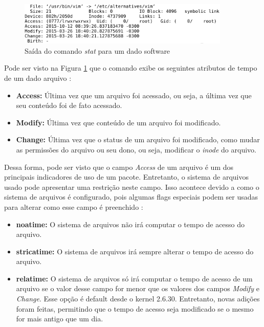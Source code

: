 \begin{figure}[h]
  \centering
  \includegraphics[width=0.9\textwidth]{figuras/comando_stat.eps}
  \caption{Saída do comando \textit{stat} para um dado software}
  \label{fig:comando_stat}
\end{figure}

Pode ser visto na Figura \ref{fig:comando_stat} que o comando exibe os seguintes
atributos de tempo de um dado arquivo \cite{1_haas}:

\begin{itemize}
    \item \textbf{Access:} Última vez que um arquivo foi acessado, ou seja, a
        última vez que seu conteúdo foi de fato acessado.
    \item \textbf{Modify:} Última vez que conteúdo de um arquivo foi modificado.
    \item \textbf{Change:} Última vez que o status de um arquivo foi modificado,
        como mudar as permissões do arquivo ou seu dono, ou seja, modificar o
        \textit{inode} do arquivo.
\end{itemize}

Dessa forma, pode ser visto que o campo \textit{Access} de um arquivo é um dos
principais indicadores de uso de um pacote. Entretanto, o sistema de arquivos
usado pode apresentar uma
restrição neste campo. Isso acontece devido a como o sistema de arquivos é
configurado, pois algumas flags especiais podem ser usadas para alterar como
esse campo é preenchido \cite{2_wiki.debian.org}:

\begin{itemize}
    \item \textbf{noatime:} O sistema de arquivos não irá computar o tempo de
        acesso do arquivo.
    \item \textbf{stricatime:} O sistema de arquivos irá sempre alterar o tempo
        de acesso do arquivo.
    \item \textbf{relatime:} O sistema de arquivos só irá computar o tempo de
        acesso de um arquivo se o valor desse campo for menor que os valores dos
        campos \textit{Modify} e \textit{Change}. Esse opção é default desde
        o kernel 2.6.30. Entretanto, novas adições foram feitas, permitindo que
        o tempo de acesso seja modificado se o mesmo for mais antigo que um dia.
\end{itemize}

